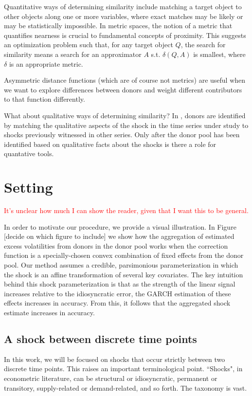 \documentclass[11pt]{article}
\theoremstyle{definition}
\begin{document}
Quantitative ways of determining similarity include matching a target object to other objects along one or more variables, where exact matches may be likely or may be statistically impossible.  In metric spaces, the notion of a metric that quantifies nearness is crucial to fundamental concepts of proximity.  This suggests an optimization problem such that, for any target object $Q$, the search for similarity means a search for an approximator $A$ s.t. $\delta(Q,A)$ is smallest, where $\delta$ is an appropriate metric.

Asymmetric distance functions (which are of course not metrics) are useful when we want to explore differences between donors and weight different contributors to that function differently.

What about qualitative ways of determining similarity?  In \cite{lundquist2024volatility}, donors are identified by matching the qualitative aspects of the shock in the time series under study to shocks previously witnessed in other series.  Only after the donor pool has been identified based on qualitative facts about the shocks is there a role for quantative tools.

\section{Setting}\label{Section}

\textcolor{red}{It's unclear how much I can show the reader, given that I want this to be general.}

In order to motivate our procedure, we provide a visual illustration.  In Figure [decide on which figure to include] %
we show how the aggregation of estimated excess volatilities from donors in the donor pool works when the correction function is a specially-chosen convex combination of fixed effects from the donor pool.  Our method assumes a credible, parsimonious parameterization in which the shock is an affine transformation of several key covariates.  The key intuition behind this shock parameterization is that as the strength of the linear signal increases relative to the idiosyncratic error, the GARCH estimation of these effects increases in accuracy.  From this, it follows that the aggregated shock estimate increases in accuracy.

\subsection{A shock between discrete time points}
In this work, we will be focused on shocks that occur strictly between two discrete time points.  This raises an important terminological point.  ``Shocks", in econometric literature, can be structural or idiosyncratic, permanent or transitory, supply-related or demand-related, and so forth.  The taxonomy is vast.
\end{document}
